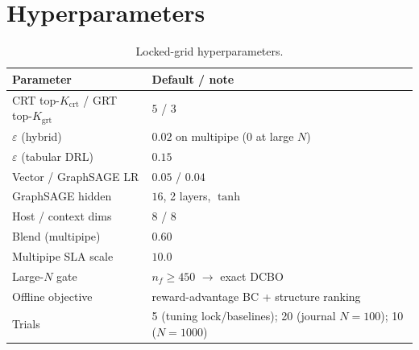 \documentclass[11pt,a4paper]{article}
\begin{document}
\section{Hyperparameters}
\begin{table}[h]
\centering
\caption{Locked-grid hyperparameters.}
\label{tab:hyper}
\small
\begin{tabular}{@{}ll@{}}
\toprule
Parameter & Default / note \\
\midrule
CRT top-$K_{\mathrm{crt}}$ / GRT top-$K_{\mathrm{grt}}$ & $5$ / $3$ \\
$\varepsilon$ (hybrid) & $0.02$ on multipipe ($0$ at large $N$) \\
$\varepsilon$ (tabular DRL) & $0.15$ \\
Vector / GraphSAGE LR & $0.05$ / $0.04$ \\
GraphSAGE hidden & $16$, 2 layers, $\tanh$ \\
Host / context dims & $8$ / $8$ \\
Blend (multipipe) & $0.60$ \\
Multipipe SLA scale & $10.0$ \\
Large-$N$ gate & $n_f\ge 450$ $\rightarrow$ exact DCBO \\
Offline objective & reward-advantage BC + structure ranking \\
Trials & 5 (tuning lock/baselines); 20 (journal $N{=}100$); 10 ($N{=}1000$) \\
\bottomrule
\end{tabular}
\end{table}
\FloatBarrier



\end{document}
